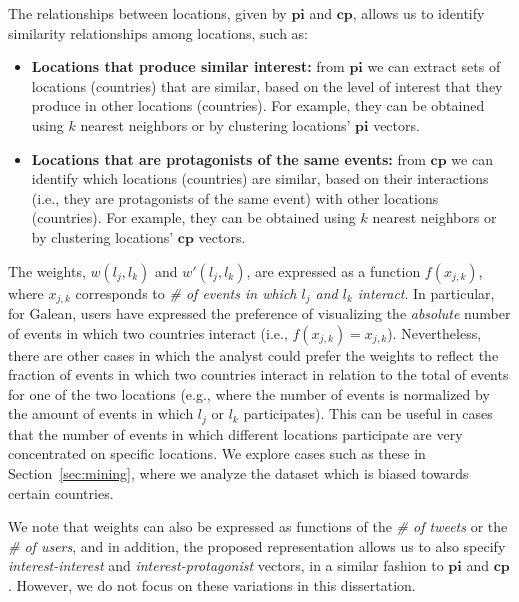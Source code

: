 The relationships between locations, given by $\mathbf{pi}$ and $\mathbf{cp}$,
allows us to identify similarity relationships among locations, such as:

\begin{itemize}
\item{\bf Locations that produce similar interest:} 
%
from $\mathbf{pi}$ we can extract sets of locations (countries) that are
similar, based on the level of interest that they produce in other locations
(countries). 
%
For example, they can be obtained using $k$ nearest neighbors or by clustering
locations' $\mathbf{pi}$ vectors.

\item{\bf Locations that are protagonists of the same events:} 
%
from $\mathbf{cp}$ we can identify which locations (countries) are similar,
based on their interactions (i.e., they are protagonists of the same event) with
other locations (countries). 
%
For example, they can be obtained using $k$ nearest neighbors or by clustering
locations' $\mathbf{cp}$ vectors.
\end{itemize}

The weights, $w(l_j,l_k)$ and $w'(l_j,l_k)$, are expressed as a function
$f(x_{j,k})$, where $x_{j,k}$ corresponds to {\em \# of events in which $l_j$
and $l_k$ interact}. 
%
In particular, for Galean, users have expressed the preference of visualizing
the {\em absolute} number of events in which two countries interact (i.e.,
$f(x_{j,k})=x_{j,k}$).  
%
Nevertheless, there are other cases in which the analyst could prefer the
weights to reflect the fraction of events in which two countries interact in
relation to the total of events for one of the two locations (e.g., where the
number of events is normalized by the amount of events in which $l_j$ or $l_k$
participates).
%
This can be useful in cases that the number of events in which different
locations participate are very concentrated on specific locations. 
%
We explore cases such as these in Section~\ref{sec:mining}, where we analyze the
dataset which is biased towards certain countries.


We note that weights can also be expressed as functions of the {\em \# of
tweets} or the {\em \# of users}, and in addition, the proposed representation
allows us to also specify {\em interest-interest} and {\em interest-protagonist}
vectors, in a similar fashion to $\mathbf{pi}$ and $\mathbf{cp}$. 
%
However, we do not focus on these variations in this dissertation.


